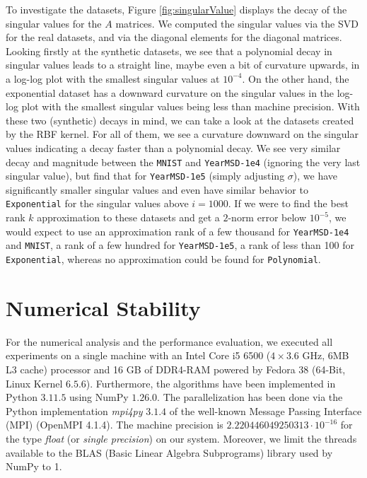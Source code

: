 \documentclass{article}
\theoremstyle{definition}
\begin{document}
To investigate the datasets, Figure \ref{fig:singularValue} displays the decay
of the singular values for the $A$ matrices. We computed the singular values via
the SVD for the real datasets, and via the diagonal elements for the diagonal
matrices. Looking firstly at the synthetic datasets, we see that a polynomial
decay in singular values leads to a straight line, maybe even a bit of curvature
upwards, in a log-log plot with the smallest singular values at $10^{-4}$. On
the other hand, the exponential dataset has a downward curvature on the singular
values in the log-log plot with the smallest singular values being less than
machine precision. With these two (synthetic) decays in mind, we can take a look
at the datasets created by the RBF kernel. For all of them, we see a curvature
downward on the singular values indicating a decay faster than a polynomial
decay. We see very similar decay and magnitude between the \texttt{MNIST} and
\texttt{YearMSD-1e4} (ignoring the very last singular value), but find that for
\texttt{YearMSD-1e5} (simply adjusting $\sigma$), we have significantly smaller
singular values and even have similar behavior to \texttt{Exponential} for the
singular values above $i=1000$. If we were to find the best rank $k$
approximation to these datasets and get a $2$-norm error below $10^{-5}$, we
would expect to use an approximation rank of a few thousand for
\texttt{YearMSD-1e4} and \texttt{MNIST}, a rank of a few hundred for
\texttt{YearMSD-1e5}, a rank of less than 100 for \texttt{Exponential}, whereas
no approximation could be found for \texttt{Polynomial}.

\section{Numerical Stability} \label{sec:num_stability}

For the numerical analysis and the performance evaluation, we executed all
experiments on a single machine with an Intel Core i5 6500 ($4 \times 3.6$ GHz,
$6$MB L3 cache) processor and 16 GB of DDR4-RAM powered by Fedora 38 (64-Bit,
Linux Kernel $6.5.6$). Furthermore, the algorithms have been implemented in
Python $3.11.5$ using NumPy $1.26.0$. The parallelization has been done via the
Python implementation \textit{mpi4py} $3.1.4$ of the well-known Message Passing
Interface (MPI) (OpenMPI 4.1.4). The machine precision is $2.220446049250313
\cdot 10^{-16}$ for the type \textit{float} (or \textit{single precision}) on
our system. Moreover, we limit the threads available to the BLAS (Basic Linear
Algebra Subprograms) library used by NumPy to 1.\newline
\end{document}

